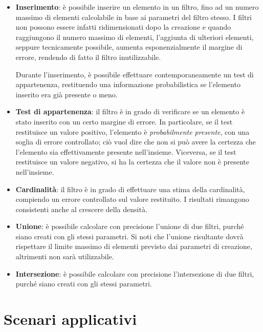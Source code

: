 \begin{itemize}
	\medskip

	\item
	\textbf{Inserimento}: è possibile inserire un elemento in un filtro, fino ad un numero massimo
	di elementi calcolabile in base ai parametri del filtro stesso. I filtri non possono essere
	infatti ridimensionati dopo la creazione e quando raggiungono il numero massimo di elementi,
	l'aggiunta di ulteriori elementi, seppure tecnicamente possibile, aumenta esponenzialmente 
	il margine di errore, rendendo di fatto il filtro inutilizzabile.

	Durante l'inserimento, è possibile effettuare contemporaneamente un test di appartenenza,
	restituendo una informazione probabilistica se l'elemento inserito era già presente o meno.

	\item
	\textbf{Test di appartenenza}: il filtro è in grado di verificare se un elemento è stato
	inserito con un certo margine di errore. In particolare, se il test restituisce un valore
	positivo, l'elemento è \emph{probabilmente presente}, con una soglia di errore controllato;
	ciò vuol dire che non si può avere la certezza che l'elemento sia effettivamente presente
	nell'insieme. Viceversa, se il test restituisce un valore negativo, si ha la certezza che il
	valore non è presente nell'insieme.

	\item
	\textbf{Cardinalità}: il filtro è in grado di effettuare una stima della cardinalità, compiendo
	un errore controllato sul valore restituito. I risultati rimangono consistenti anche al crescere
	della densità.

	\item
	\textbf{Unione}: è possibile calcolare con precisione l'unione di due filtri, purché siano
	creati con gli stessi parametri. Si noti che l'unione risultante dovrà rispettare il limite
	massimo di elementi previsto dai parametri di creazione, altrimenti non sarà utilizzabile.

	\item
	\textbf{Intersezione}: è possibile calcolare con precisione l'intersezione di due filtri,
	purché siano creati con gli stessi parametri.

\end{itemize}

\section{Scenari applicativi}
\label{sec:bloom:scenari}

